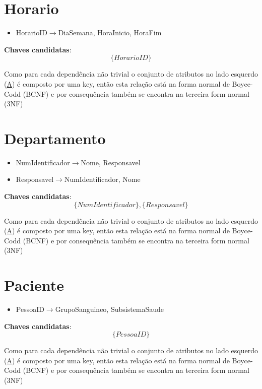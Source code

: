 \documentclass[article, a4paper, 12pt, oneside]{memoir}
\begin{document}
\section*{Horario}
\begin{itemize}
	\item HorarioID$\rightarrow$DiaSemana, HoraInicio, HoraFim
\end{itemize}

\textbf{Chaves candidatas}:\\
\[
\{ HorarioID \}
\]

Como para cada dependência não trivial o conjunto de atributos no lado esquerdo (\underline{A}) é composto por uma key, então esta relação está na forma normal de Boyce-Codd (BCNF) e por consequência também se encontra na terceira form normal (3NF)

\section*{Departamento}
\begin{itemize}
	\item NumIdentificador$\rightarrow$Nome, Responsavel
	\item Responsavel$\rightarrow$NumIdentificador, Nome
\end{itemize}

\textbf{Chaves candidatas}:\\
\[
\{ NumIdentificador \}, \{ Responsavel \}
\]

Como para cada dependência não trivial o conjunto de atributos no lado esquerdo (\underline{A}) é composto por uma key, então esta relação está na forma normal de Boyce-Codd (BCNF) e por consequência também se encontra na terceira form normal (3NF)

\section*{Paciente}
\begin{itemize}
	\item PessoaID$\rightarrow$GrupoSanguineo, SubsistemaSaude
\end{itemize}

\textbf{Chaves candidatas}:\\
\[
\{ PessoaID \}
\]

Como para cada dependência não trivial o conjunto de atributos no lado esquerdo (\underline{A}) é composto por uma key, então esta relação está na forma normal de Boyce-Codd (BCNF) e por consequência também se encontra na terceira form normal (3NF)
\end{document}
